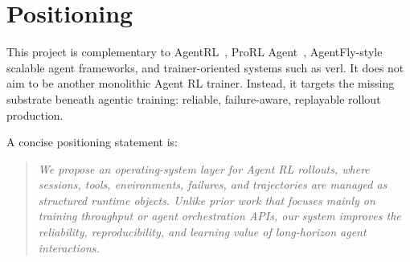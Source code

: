 \documentclass[11pt]{article}
\begin{document}
\section{Positioning}

This project is complementary to AgentRL~\cite{zhang2025agentrl}, ProRL Agent~\cite{prorlagent2026}, AgentFly-style scalable agent frameworks, and trainer-oriented systems such as verl.
It does not aim to be another monolithic Agent RL trainer.
Instead, it targets the missing substrate beneath agentic training: reliable, failure-aware, replayable rollout production.

A concise positioning statement is:

\begin{quote}
\emph{We propose an operating-system layer for Agent RL rollouts, where sessions, tools, environments, failures, and trajectories are managed as structured runtime objects. Unlike prior work that focuses mainly on training throughput or agent orchestration APIs, our system improves the reliability, reproducibility, and learning value of long-horizon agent interactions.}
\end{quote}



\end{document}
